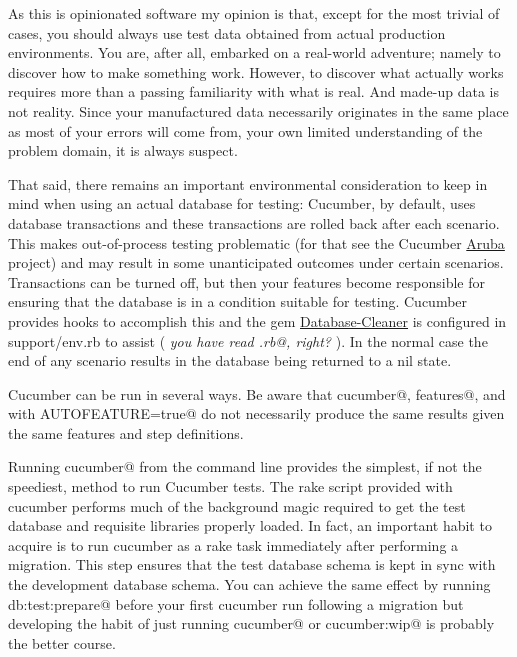 \documentclass[10pt]{book}
\begin{document}
As this is opinionated software my opinion is that, except for the most trivial of cases, you should always use test data obtained from actual production environments.  You are, after all, embarked on a real-world adventure; namely to discover how to make something work.  However, to discover what actually works requires more than a passing familiarity with what is real.  And made-up data is not reality.  Since your manufactured data necessarily originates in the same place as most of your errors will come from, your own limited understanding of the problem domain, it is always suspect.

That said, there remains an important environmental consideration to keep in mind when using an actual database for testing: Cucumber, by default, uses database transactions and these transactions are rolled back after each scenario.  This makes out-of-process testing problematic (for that see the Cucumber \href{http://github.com/cucumber/aruba}{Aruba} project)  and may result in some unanticipated outcomes under certain scenarios.  Transactions can be turned off, but then your features become responsible for ensuring that the database is in a condition suitable for testing.  Cucumber provides hooks to accomplish this and the gem \href{http://github.com/bmabey/database_cleaner}{Database-Cleaner} is configured in support/env.rb to assist ( \emph{you have read \verb@env.rb@, right?} ). In the normal case the end of any scenario results in the database being returned to a nil state.

Cucumber can be run in several ways.  Be aware that \verb@rake cucumber@, \verb@cucumber features@, and \verb@autotest@ with \verb@ENV AUTOFEATURE=true@ do not necessarily produce the same results given the same features and step definitions.

Running \verb@rake cucumber@ from the command line provides the simplest, if not the speediest, method to run Cucumber tests. The rake script provided with cucumber performs much of the background magic required to get the test database and requisite libraries properly loaded.  In fact, an important habit to acquire is to run cucumber as a rake task immediately after performing a migration.  This step ensures that the test database schema is kept in sync with the development database schema.  You can achieve the same effect by running \verb@rake db:test:prepare@ before your first cucumber run following a migration but developing the habit of just running \verb@rake cucumber@ or \verb@rake cucumber:wip@ is probably the better course.
\end{document}
